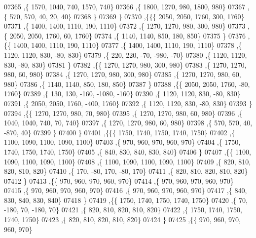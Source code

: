 \begin{DoxyCode}
07365     ,\{  1570,  1040,   740,  1570,   740\}
07366     ,\{  1800,  1270,   980,  1800,   980\}
07367     ,\{   570,   570,    40,    20,    40\}
07368     \}
07369    \}
07370   ,\{\{\{  2050,  2050,  1760,   300,  1760\}
07371     ,\{  1400,  1400,  1110,   190,  1110\}
07372     ,\{  1270,  1270,   980,   300,   980\}
07373     ,\{  2050,  2050,  1760,    60,  1760\}
07374     ,\{  1140,  1140,   850,   180,   850\}
07375     \}
07376    ,\{\{  1400,  1400,  1110,   190,  1110\}
07377     ,\{  1400,  1400,  1110,   190,  1110\}
07378     ,\{  1120,  1120,   830,   -80,   830\}
07379     ,\{   220,   220,   -70,  -980,   -70\}
07380     ,\{  1120,  1120,   830,   -80,   830\}
07381     \}
07382    ,\{\{  1270,  1270,   980,   300,   980\}
07383     ,\{  1270,  1270,   980,    60,   980\}
07384     ,\{  1270,  1270,   980,   300,   980\}
07385     ,\{  1270,  1270,   980,    60,   980\}
07386     ,\{  1140,  1140,   850,   180,   850\}
07387     \}
07388    ,\{\{  2050,  2050,  1760,   -80,  1760\}
07389     ,\{   130,   130,  -160, -1080,  -160\}
07390     ,\{  1120,  1120,   830,   -80,   830\}
07391     ,\{  2050,  2050,  1760,  -400,  1760\}
07392     ,\{  1120,  1120,   830,   -80,   830\}
07393     \}
07394    ,\{\{  1270,  1270,   980,    70,   980\}
07395     ,\{  1270,  1270,   980,    60,   980\}
07396     ,\{  1040,  1040,   740,    70,   740\}
07397     ,\{  1270,  1270,   980,    60,   980\}
07398     ,\{   570,   570,    40,  -870,    40\}
07399     \}
07400    \}
07401   ,\{\{\{  1750,  1740,  1750,  1740,  1750\}
07402     ,\{  1100,  1090,  1100,  1090,  1100\}
07403     ,\{   970,   960,   970,   960,   970\}
07404     ,\{  1750,  1740,  1750,  1740,  1750\}
07405     ,\{   840,   830,   840,   830,   840\}
07406     \}
07407    ,\{\{  1100,  1090,  1100,  1090,  1100\}
07408     ,\{  1100,  1090,  1100,  1090,  1100\}
07409     ,\{   820,   810,   820,   810,   820\}
07410     ,\{   170,   -80,   170,   -80,   170\}
07411     ,\{   820,   810,   820,   810,   820\}
07412     \}
07413    ,\{\{   970,   960,   970,   960,   970\}
07414     ,\{   970,   960,   970,   960,   970\}
07415     ,\{   970,   960,   970,   960,   970\}
07416     ,\{   970,   960,   970,   960,   970\}
07417     ,\{   840,   830,   840,   830,   840\}
07418     \}
07419    ,\{\{  1750,  1740,  1750,  1740,  1750\}
07420     ,\{    70,  -180,    70,  -180,    70\}
07421     ,\{   820,   810,   820,   810,   820\}
07422     ,\{  1750,  1740,  1750,  1740,  1750\}
07423     ,\{   820,   810,   820,   810,   820\}
07424     \}
07425    ,\{\{   970,   960,   970,   960,   970\}

\end{DoxyCode}
